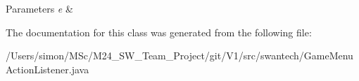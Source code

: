 \begin{DoxyParams}{Parameters}
{\em e} & \\
\hline
\end{DoxyParams}


The documentation for this class was generated from the following file\+:\begin{DoxyCompactItemize}
\item 
/\+Users/simon/\+M\+Sc/\+M24\+\_\+\+S\+W\+\_\+\+Team\+\_\+\+Project/git/\+V1/src/swantech/Game\+Menu\+Action\+Listener.\+java\end{DoxyCompactItemize}

